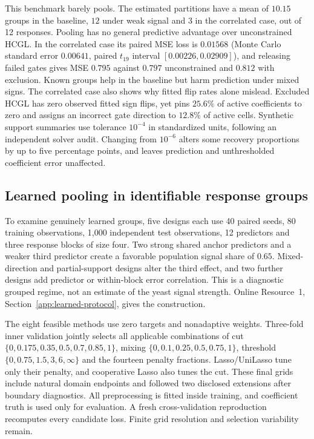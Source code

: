 \documentclass[lineno,pdflatex,sn-basic]{sn-jnl}
\theoremstyle{thmstyleone}
\begin{document}
This benchmark barely pools. The estimated partitions have a mean of $10.15$
groups in the baseline, $12$ under weak signal and $3$ in the correlated
case, out of 12 responses. Pooling has no general predictive advantage over
unconstrained HCGL. In the correlated case its paired MSE loss is $0.01568$
(Monte Carlo standard error $0.00641$, paired $t_{19}$ interval
$[0.00226,0.02909]$), and releasing failed gates gives MSE $0.795$ against
$0.797$ unconstrained and $0.812$ with exclusion. Known groups help in the
baseline but harm prediction under mixed signs. The correlated case also
shows why fitted flip rates alone mislead. Excluded HCGL has zero observed
fitted sign flips, yet pins $25.6\%$ of active coefficients to zero and
assigns an incorrect gate direction to $12.8\%$ of active cells. Synthetic
support summaries use tolerance $10^{-4}$ in standardized units, following an
independent solver audit. Changing from $10^{-6}$ alters some recovery
proportions by up to five percentage points, and leaves prediction and
unthresholded coefficient error unaffected.

\subsection{Learned pooling in identifiable response groups}\label{sec:learned-validation}

To examine genuinely learned groups, five designs each use 40 paired seeds,
80 training observations, 1,000 independent test observations, 12 predictors
and three response blocks of size four. Two strong shared anchor predictors
and a weaker third predictor create a favorable population signal share of
$0.65$. Mixed-direction and partial-support designs alter the third effect, and
two further designs add predictor or within-block error correlation. This is
a diagnostic grouped regime, not an estimate of the yeast signal strength.
Online Resource~1, Section~\ref{app:learned-protocol}, gives the construction.

The eight feasible methods use zero targets and nonadaptive weights.
Three-fold inner validation jointly selects all applicable combinations of
cut $\{0,0.175,0.35,0.5,0.7,0.85,1\}$, mixing
$\{0,0.1,0.25,0.5,0.75,1\}$, threshold $\{0,0.75,1.5,3,6,\infty\}$
and the fourteen penalty fractions. Lasso/UniLasso tune only their penalty, and
cooperative Lasso also tunes the cut. These final grids include natural domain
endpoints and followed two disclosed extensions after boundary diagnostics.
All preprocessing is fitted inside training, and coefficient truth is used only
for evaluation. A fresh cross-validation reproduction recomputes every
candidate loss. Finite grid resolution and selection variability remain.
\end{document}

